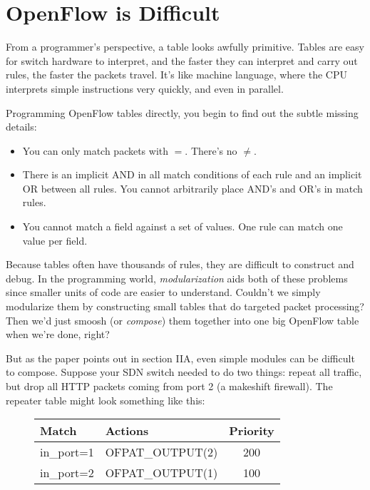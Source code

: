 \section{OpenFlow is Difficult}

From a programmer's perspective, a table looks awfully primitive.  
Tables are easy for switch hardware to interpret, and the faster they can interpret and carry 
out rules, the faster the packets travel.  
It's like machine language, where the CPU interprets simple instructions very quickly, and even in parallel.

Programming OpenFlow tables directly, you begin to find out the subtle missing details:

\begin{itemize}
\item You can only match packets with $=$.   There's no $\neq$.
\item There is an implicit AND in all match conditions of each rule and an implicit OR between all rules.  You cannot 
arbitrarily place AND's and OR's in match rules.
\item You cannot match a field against a set of values.  One rule can match one value per field.    
\end{itemize}

Because tables often have thousands of rules, they are difficult to construct and debug.  
In the programming world, \emph{modularization} aids both of these problems since smaller units of code
are easier to understand.  
Couldn't we simply modularize them by 
constructing small tables that do targeted packet processing?  Then we'd just smoosh (or \emph{compose}) them
together into one big OpenFlow table when we're done, right?  

But as the paper \citet{frenetic} points out in section IIA, even simple modules can be difficult
to compose.   Suppose your SDN switch needed to do two things: repeat all traffic, but drop all
HTTP packets coming from port 2 (a makeshift firewall).  The repeater table might look something like this:

\bigskip
\bigskip
\bigskip
\bigskip
\bigskip
\bigskip
\bigskip


\begin{figure}[h]
\centering
\begin{tabularx}{3.3in}{|l|l|c|}
\hline\hline
Match & Actions & Priority
\\ \hline
in\_port=1 & OFPAT\_OUTPUT(2) & 200
\\ \hline
in\_port=2 & OFPAT\_OUTPUT(1) & 100
\\ \hline\hline
\end{tabularx}
\end{figure}

